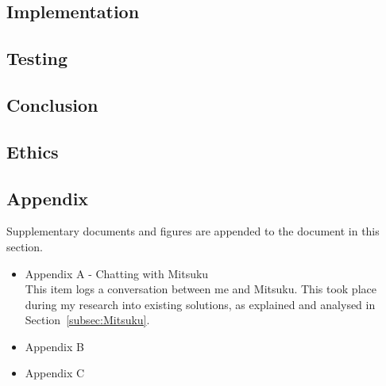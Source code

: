 \subsection*{Implementation}

\subsection*{Testing}

\subsection*{Conclusion}

\subsection*{Ethics}

\subsection*{Appendix}
Supplementary documents and figures are appended to the document in this section.
\begin{itemize}
	\item Appendix A - Chatting with Mitsuku \\ This item logs a conversation between me and Mitsuku. This took place during my research into existing solutions, as explained and analysed in Section~\ref{subsec:Mitsuku}.
	
	\item Appendix B
	
	\item Appendix C
\end{itemize}
